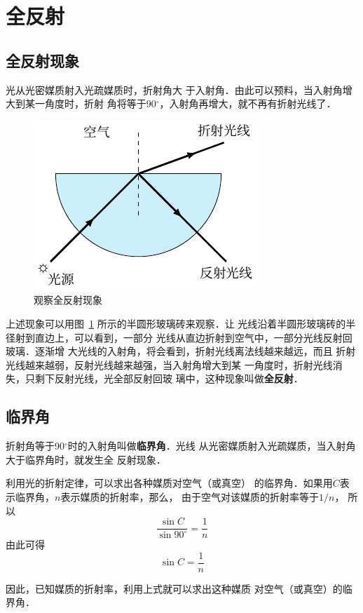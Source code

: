 \section{全反射}
\subsection{全反射现象}

光从光密媒质射入光疏媒质时，折射角大
于入射角．由此可以预料，当入射角增大到某一角度时，折射
角将等于90$^\circ$，入射角再增大，就不再有折射光线了．
\begin{figure}[htbp]
    \centering
    \includegraphics{fig/C/5-23.pdf}
    \caption{观察全反射现象}\label{fig_C_5-23}
\end{figure}

上述现象可以用图~\ref{fig_C_5-23} 所示的半圆形玻璃砖来观察．让
光线沿着半圆形玻璃砖的半径射到直边上，可以看到，一部分
光线从直边折射到空气中，一部分光线反射回玻璃．逐渐增
大光线的入射角，将会看到，折射光线离法线越来越远，而且
折射光线越来越弱，反射光线越来越强，当入射角增大到某
一角度时，折射光线消失，只剩下反射光线，光全部反射回玻
璃中，这种现象叫做\textbf{全反射}．

\subsection{临界角}

折射角等于90$^\circ$时的入射角叫做\textbf{临界角}．光线
从光密媒质射入光疏媒质，当入射角大于临界角时，就发生全
反射现象．

利用光的折射定律，可以求出各种媒质对空气（或真空）
的临界角．如果用$C$表示临界角，$n$表示媒质的折射率，那么，
由于空气对该媒质的折射率等于$1/n$，
所以
\[\frac{\sin C}{\sin 90^\circ}=\frac{1}{n} \]
由此可得
\[\sin C=\frac{1}{n} \]

因此，已知媒质的折射率，利用上式就可以求出这种媒质
对空气（或真空）的临界角．

